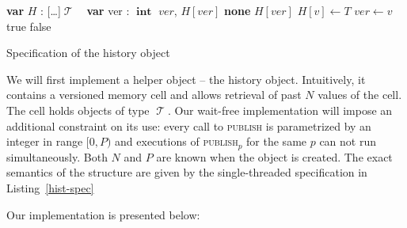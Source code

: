 \documentclass[a4paper,11pt]{article}
\def\none{\textbf{none} }
\def\T{\ensuremath{\operatorname{\mathcal{T}}}\text{ }}
\def\int{\ensuremath{\operatorname{\textbf{int}}}}
\newcommand{\fn}[1]{\textsc{#1}}
\newcommand{\var}[2]{\textbf{var }#1 : #2}
\newcommand{\arrayspec}[1]{\text{array}[#1]\text{ of }}
\begin{document}
\begin{Listing}[!h]
\begin{algorithmic}[1]
	\State\var{$H$}{\arrayspec{\ldots}$\T$}
	\State\var{ver}{\int} %
		\State \Return $ver$, $H[ver]$
	\EndFunction
			\State \Return \none
		\Else
		\State \Return $H[ver]$
		\EndIf
	\EndFunction
		\State $H[v] \gets T$
			\State $ver \gets v$
			\State \Return true
		\Else
			\State \Return false
		\EndIf
	\EndFunction
\end{algorithmic}
\caption{Specification of the history object}
\label{hist-spec}
\end{Listing}
We will first implement a helper object -- the history object. Intuitively, it contains a versioned memory cell and allows retrieval of past $N$ values of the cell. The cell holds objects of type \T.
Our wait-free implementation will impose an additional constraint on its use: every call to \fn{publish} is parametrized by an integer in range $[0,P)$ and executions of \fn{publish$_p$} for the same $p$ can not run simultaneously.
	Both $N$ and $P$ are known when the object is created. The exact semantics of the structure are given by the single-threaded specification in Listing~\ref{hist-spec}

\FloatBarrier

Our implementation is presented below:
\end{document}
